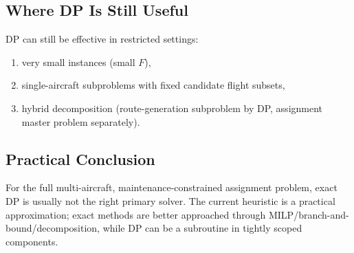 \documentclass[11pt,a4paper]{article}
\begin{document}
\subsection{Where DP Is Still Useful}
DP can still be effective in restricted settings:
\begin{enumerate}[leftmargin=1.4em]
    \item very small instances (small $F$),
    \item single-aircraft subproblems with fixed candidate flight subsets,
    \item hybrid decomposition (route-generation subproblem by DP, assignment master problem separately).
\end{enumerate}

\subsection{Practical Conclusion}
For the full multi-aircraft, maintenance-constrained assignment problem, exact DP is usually not the right primary solver. The current heuristic is a practical approximation; exact methods are better approached through MILP/branch-and-bound/decomposition, while DP can be a subroutine in tightly scoped components.
\end{document}
